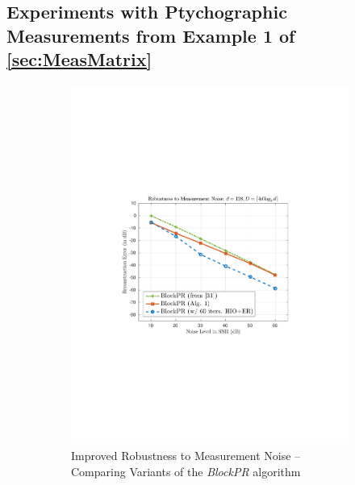 \subsection{Experiments with Ptychographic Measurements from Example 1 of \cref{sec:MeasMatrix}}
\label{sec:PtychographicMeasExper}

%
\begin{figure}[hbtp]
\centering
\begin{subfigure}[b]{0.8\textwidth}
\centering
\includegraphics[clip=true, trim = 1.5in 3.35in 1.6in 3.25in,scale=0.8]{pics/fig6a}
\caption{Improved Robustness to Measurement Noise -- Comparing Variants of the {\em BlockPR}
algorithm}
\label{fig:global_vs_local_ptych}
\end{subfigure}
\hfill
\begin{subfigure}[b]{0.8\textwidth}
\centering

\end{subfigure}
\end{figure}
